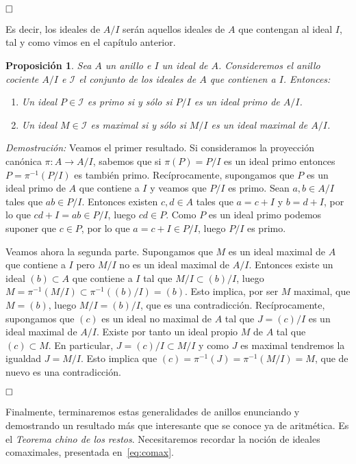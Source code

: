 \documentclass[12pt]{article}
\newtheorem{proposition}[theorem]{Proposición}
\begin{document}
$\hfill \square$

Es decir, los ideales de $A/I$ serán aquellos ideales de $A$ que contengan al ideal $I$, tal y como vimos en el capítulo anterior.

\begin{proposition}Sea $A$ un anillo e $I$ un ideal de $A$. Consideremos el anillo cociente $A/I$ e $\mathcal{I}$ el conjunto de los ideales de $A$ que contienen a $I$. Entonces: 
\begin{enumerate}
\item Un ideal $P \in \mathcal{I}$ es primo si y sólo si $P/I$ es un ideal primo de $A/I$.
\item Un ideal $M \in \mathcal{I}$ es maximal si y sólo si $M/I$ es un ideal maximal de $A/I$.
\end{enumerate}
\end{proposition}
\emph{Demostración: }Veamos el primer resultado. Si consideramos la proyección canónica $\pi \colon A \longrightarrow A/I$, sabemos que si $\pi (P) = P/I$ es un ideal primo entonces $P = \pi^{-1} (P/I)$ es también primo. Recíprocamente, supongamos que $P$ es un ideal primo de $A$ que contiene a $I$ y veamos que $P/I$ es primo. Sean $a,b \in A/I$ tales que $ab \in P/I$. Entonces existen $c,d \in A$ tales que $a = c + I$ y $b = d + I$, por lo que $cd + I = ab \in P/I$, luego $cd \in P$. Como $P$ es un ideal primo podemos suponer que $c \in P$, por lo que $a = c+ I \in P/I$, luego $P/I$ es primo.

Veamos ahora la segunda parte. Supongamos que $M$ es un ideal maximal de $A$ que contiene a $I$ pero $M/I$ no es un ideal maximal de $A/I$. Entonces existe un ideal $(b) \subset A$ que contiene a $I$ tal que $M/I \subset (b)/I$, luego $M = \pi^{-1}(M/I) \subset \pi^{-1}((b)/I) = (b)$. Esto implica, por ser $M$ maximal, que $M = (b)$, luego $M/I = (b) /I$, que es una contradicción. Recíprocamente, supongamos que $(c)$ es un ideal no maximal de $A$ tal que $J = (c)/I$ es un ideal maximal de $A/I$. Existe por tanto un ideal propio $M$ de $A$ tal que $(c) \subset M$. En particular, $J = (c)/I \subset M/I$ y como $J$ es maximal tendremos la igualdad $J = M/I$. Esto implica que $(c) = \pi^{-1}(J) = \pi^{-1}(M/I) = M$, que de nuevo es una contradicción.

$\hfill \square$

Finalmente, terminaremos estas generalidades de anillos enunciando y demostrando un resultado más que interesante que se conoce ya de aritmética. Es el \textit{Teorema chino de los restos}. Necesitaremos recordar la noción de ideales comaximales, presentada en~\ref{eq:comax}.
\end{document}

